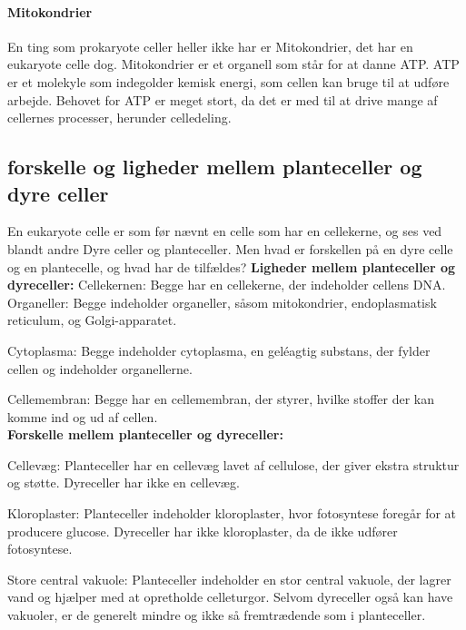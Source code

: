             \paragraph{Mitokondrier}
                En ting som prokaryote celler heller ikke har er Mitokondrier, det har en eukaryote celle dog. Mitokondrier er et organell som står for at danne ATP.
                ATP er et molekyle som indegolder kemisk energi, som cellen kan bruge til at udføre arbejde. Behovet for ATP er meget stort, da det er med til at drive mange af cellernes processer, herunder celledeling.   
            
        \subsection*{forskelle og ligheder mellem planteceller og dyre celler}
            En eukaryote celle er som før nævnt en celle som har en cellekerne, og ses ved blandt andre Dyre celler og planteceller. Men hvad er forskellen på en dyre celle og en plantecelle, og hvad har de tilfældes?
            \newline\textbf{Ligheder mellem planteceller og dyreceller:}\newline
            Cellekernen: Begge har en cellekerne, der indeholder cellens DNA.
            Organeller: Begge indeholder organeller, såsom mitokondrier, endoplasmatisk reticulum, og Golgi-apparatet.

            Cytoplasma: Begge indeholder cytoplasma, en geléagtig substans, der fylder cellen og indeholder organellerne.

            Cellemembran: Begge har en cellemembran, der styrer, hvilke stoffer der kan komme ind og ud af cellen. \\
            \textbf{Forskelle mellem planteceller og dyreceller:}\newline

            Cellevæg: Planteceller har en cellevæg lavet af cellulose, der giver ekstra struktur og støtte. Dyreceller har ikke en cellevæg.

            Kloroplaster: Planteceller indeholder kloroplaster, hvor fotosyntese foregår for at producere glucose. Dyreceller har ikke kloroplaster, da de ikke udfører fotosyntese.

            Store central vakuole: Planteceller indeholder en stor central vakuole, der lagrer vand og hjælper med at opretholde celleturgor. Selvom dyreceller også kan have vakuoler, er de generelt mindre og ikke så fremtrædende som i planteceller.

